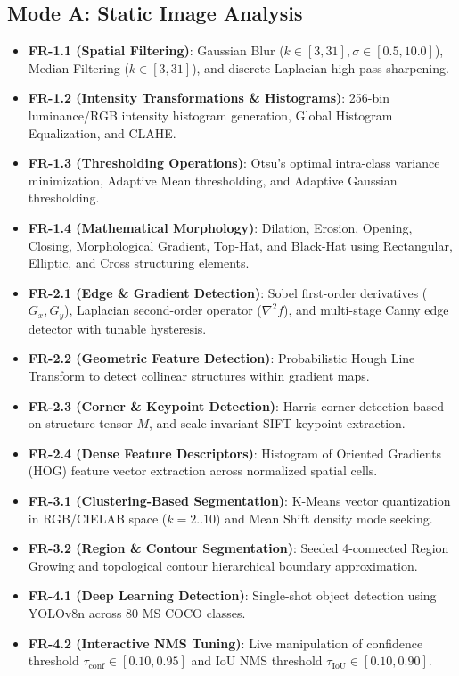 \documentclass[12pt,a4paper]{article}
\begin{document}
\subsection{Mode A: Static Image Analysis}
\begin{itemize}
    \item \textbf{FR-1.1 (Spatial Filtering)}: Gaussian Blur ($k \in [3, 31], \sigma \in [0.5, 10.0]$), Median Filtering ($k \in [3, 31]$), and discrete Laplacian high-pass sharpening.
    \item \textbf{FR-1.2 (Intensity Transformations \& Histograms)}: 256-bin luminance/RGB intensity histogram generation, Global Histogram Equalization, and CLAHE.
    \item \textbf{FR-1.3 (Thresholding Operations)}: Otsu's optimal intra-class variance minimization, Adaptive Mean thresholding, and Adaptive Gaussian thresholding.
    \item \textbf{FR-1.4 (Mathematical Morphology)}: Dilation, Erosion, Opening, Closing, Morphological Gradient, Top-Hat, and Black-Hat using Rectangular, Elliptic, and Cross structuring elements.
    \item \textbf{FR-2.1 (Edge \& Gradient Detection)}: Sobel first-order derivatives ($G_x, G_y$), Laplacian second-order operator ($\nabla^2 f$), and multi-stage Canny edge detector with tunable hysteresis.
    \item \textbf{FR-2.2 (Geometric Feature Detection)}: Probabilistic Hough Line Transform to detect collinear structures within gradient maps.
    \item \textbf{FR-2.3 (Corner \& Keypoint Detection)}: Harris corner detection based on structure tensor $M$, and scale-invariant SIFT keypoint extraction.
    \item \textbf{FR-2.4 (Dense Feature Descriptors)}: Histogram of Oriented Gradients (HOG) feature vector extraction across normalized spatial cells.
    \item \textbf{FR-3.1 (Clustering-Based Segmentation)}: K-Means vector quantization in RGB/CIELAB space ($k=2..10$) and Mean Shift density mode seeking.
    \item \textbf{FR-3.2 (Region \& Contour Segmentation)}: Seeded 4-connected Region Growing and topological contour hierarchical boundary approximation.
    \item \textbf{FR-4.1 (Deep Learning Detection)}: Single-shot object detection using YOLOv8n across 80 MS COCO classes.
    \item \textbf{FR-4.2 (Interactive NMS Tuning)}: Live manipulation of confidence threshold $\tau_{\text{conf}} \in [0.10, 0.95]$ and IoU NMS threshold $\tau_{\text{IoU}} \in [0.10, 0.90]$.
\end{itemize}
\end{document}
